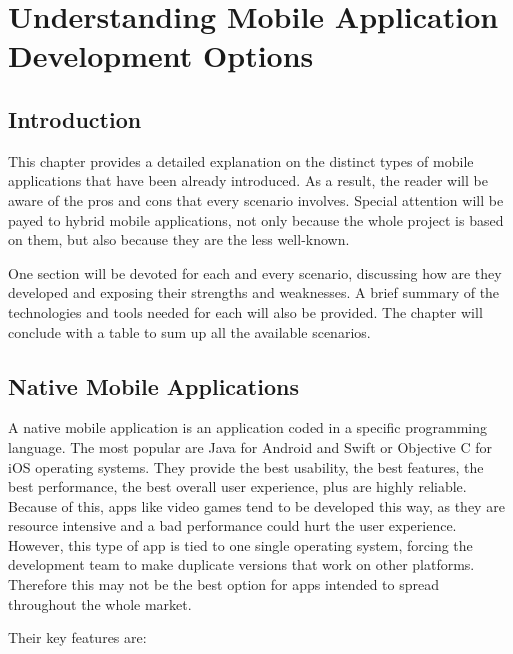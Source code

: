 \chapter{Understanding Mobile Application Development Options}
\label{ch:mobileoptions}
\justifying
\section{Introduction}

This chapter provides a detailed explanation on the distinct types of mobile applications that have been already introduced. As a result, the reader will be aware of the pros and cons that every scenario involves. Special attention will be payed to hybrid mobile applications, not only because the whole project is based on them, but also because they are the less well-known.

One section will be devoted for each and every scenario, discussing how are they developed and exposing their strengths and weaknesses. A brief summary of the technologies and tools needed for each will also be provided. The chapter will conclude with a table to sum up all the available scenarios.

\section{Native Mobile Applications}

A native mobile application is an application coded in a specific programming language. The most popular are Java for Android and Swift or Objective C for iOS operating systems. They provide the best usability, the best features, the best performance, the best overall user experience, plus are highly reliable. Because of this, apps like video games tend to be developed this way, as they are resource intensive and a bad performance could hurt the user experience. However, this type of app is tied to one single operating system, forcing the development team to make duplicate versions that work on other platforms. Therefore this may not be the best option for apps intended to spread throughout the whole market.

Their key features are:

